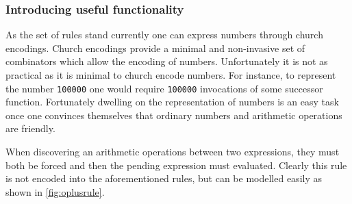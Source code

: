 \documentclass[11pt,oneside,a4paper]{report}
\begin{document}
\subsubsection{Introducing useful functionality}
As the set of rules stand currently one can express numbers through church encodings.
Church encodings provide a minimal and non-invasive set of combinators which allow the encoding of numbers.
Unfortunately it is not as practical as it is minimal to church encode numbers.
For instance, to represent the number \texttt{100000} one would require \texttt{100000} invocations of some successor function.
Fortunately dwelling on the representation of numbers is an easy task once one convinces themselves that ordinary numbers and arithmetic operations are friendly.

When discovering an arithmetic operations between two expressions, they must both be forced and then the pending expression must evaluated.
Clearly this rule is not encoded into the aforementioned rules, but can be modelled easily as shown in \autoref{fig:oplusrule}.
\begin{figure}[ht]
  \begin{mdframed}[style=style1]
        \begin{subfigure}[b]{1\textwidth}
        \vspace*{0.49cm}
          \begin{prooftree}
          \end{prooftree}   
        \end{subfigure}
        \begin{subfigure}[b]{1\textwidth}
        \vspace*{0.49cm}
            \begin{prooftree}
            \end{prooftree}   
        \end{subfigure}
  \end{mdframed}
  \caption{}
  \label{fig:oplusrule}
\end{figure}
\end{document}
